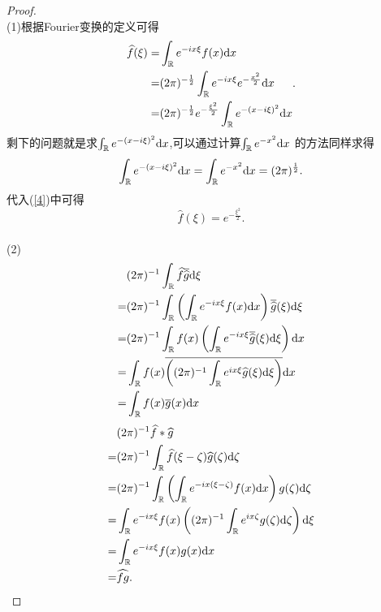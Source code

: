 \begin{proof}\\
  (1)根据Fourier变换的定义可得
  \begin{equation}\label{4}
    \begin{aligned}
    \widehat{f}(\xi)=&\int_{\mathbb{R}}e^{-ix\xi}f(x)\mathrm{d}x\\
    =& (2\pi)^{-\frac{1}{2}} \int_{\mathbb{R}}e^{-ix\xi}e^{-\frac{x^2}{2}}\mathrm{d}x\\
    =&(2\pi)^{-\frac{1}{2}}e^{-\frac{\xi^2}{2}}\int_{\mathbb{R}} e^{-(x-i\xi)^2}\mathrm{d}x
    \end{aligned}
  .\end{equation}
  剩下的问题就是求$\int_{\mathbb{R}}e^{-(x-i\xi)^2}\mathrm{d}x$,可以通过计算$\int_{\mathbb{R}}e^{-x^2}\mathrm{d}x$ 的方法同样求得
  \[
    \int_{\mathbb{R}}e^{-(x-i\xi)^2}\mathrm{d}x=\int_{\mathbb{R}}e^{-x^2}\mathrm{d}x=(2\pi)^{\frac{1}{2}}.
  \] 
  代入(\ref{4})中可得
  \[
    \widehat{f}(\xi)=e^{-\frac{\xi^2}{2}}.
  \]\\
  (2)
  \begin{equation*}
    \begin{aligned} 
    &(2\pi)^{-1}\int_{\mathbb{R}}\widehat{f}\overline{\widehat{g}}\mathrm{d}\xi\\
    =& (2\pi)^{-1}\int_{\mathbb{R}}\left( \int_{\mathbb{R}}e^{-ix\xi}f(x)\mathrm{d}x \right) \overline{\widehat{g}}(\xi)\mathrm{d}\xi\\
    =& (2\pi)^{-1}\int_{\mathbb{R}}f(x)\left( \int_{\mathbb{R}}e^{-ix\xi}\overline{\widehat{g}}(\xi)\mathrm{d}\xi \right) \mathrm{d}x\\
    =& \int_{\mathbb{R}}f(x)\overline{\left( (2\pi)^{-1}\int_{\mathbb{R}}e^{ix\xi} \widehat{g}(\xi)\mathrm{d}\xi \right) }\mathrm{d}x\\
    =& \int_{\mathbb{R}}f(x)\overline{g}(x)\mathrm{d}x
    \end{aligned}
  \end{equation*}
\begin{equation*}
  \begin{aligned}
    &(2\pi)^{-1} \widehat{f}*\widehat{g}\\
    =&(2\pi)^{-1} \int_{\mathbb{R}}\widehat{f}(\xi-\zeta)\widehat{g}(\zeta)\mathrm{d}\zeta\\
    =& (2\pi)^{-1}\int_{\mathbb{R}}\left( \int_{\mathbb{R}}e^{-ix(\xi-\zeta)}f(x)\mathrm{d}x \right)g(\zeta)\mathrm{d}\zeta\\
    =& \int_{\mathbb{R}}e^{-ix\xi}f(x)\left( (2\pi)^{-1}\int_{\mathbb{R}}e^{ix\zeta}g(\zeta)\mathrm{d}\zeta \right) \mathrm{d}\xi\\
    = & \int_{\mathbb{R}}e^{-ix\xi}f(x)g(x)\mathrm{d}x\\
    =& \widehat{fg}.
  \end{aligned}
\end{equation*}
\end{proof}
